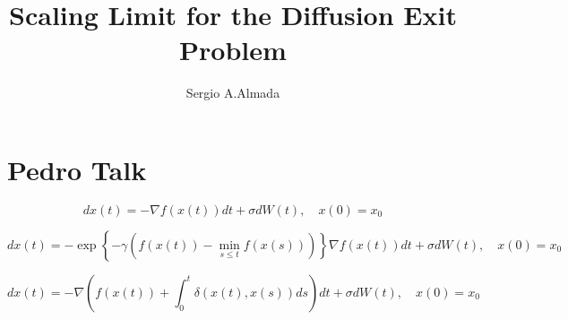\documentclass{amsproc}
\title{Scaling Limit for the Diffusion Exit Problem}
\author{Sergio A.Almada}
\begin{document}
\section{Pedro Talk}


\[
d x (t) = - \nabla f ( x(t) )dt + \sigma dW(t), \quad x(0) = x_0
\]

\[
dx(t) =  -\exp\left \{ -\gamma \left (  f(x(t)) - \min_{s\leq t} f(x(s))  \right ) \right\}\nabla f ( x(t) )dt + \sigma dW(t), \quad x(0) = x_0
\]

\[
dx(t) =  -\nabla \left( f ( x(t) ) + \int_0^t \delta(x(t),x(s))ds \right) dt + \sigma dW(t), \quad x(0) = x_0
\]
\end{document}
